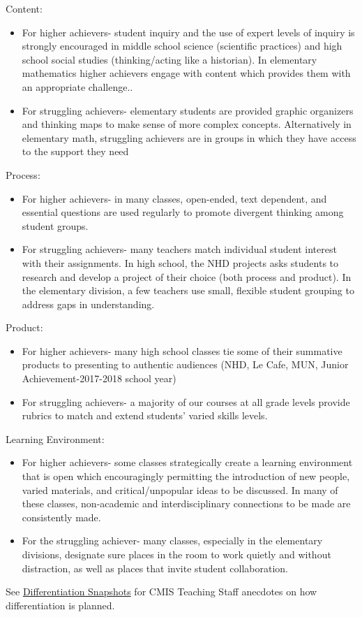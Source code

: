\documentclass{report}
\begin{document}
\begin{findings}
Content:
\begin{itemize}
\item For higher achievers- student inquiry and the use of expert levels of inquiry is strongly encouraged in middle school science (scientific practices) and high school social studies (thinking/acting like a historian). In elementary mathematics higher achievers engage with content which provides them with an appropriate challenge..
\item For struggling achievers- elementary students are provided graphic organizers and thinking maps to make sense of more complex concepts. Alternatively in elementary math, struggling achievers are in groups in which they have access to the support they need
\end{itemize}
Process:
\begin{itemize} 
\item For higher achievers- in many classes, open-ended, text dependent, and essential questions are used regularly to promote divergent thinking among student groups. 
\item For struggling achievers- many teachers match individual student interest with their assignments. In high school, the NHD projects asks students to research and develop a project of their choice (both process and product). In the elementary division, a few teachers use small, flexible student grouping to address gaps in understanding. 
\end{itemize}
Product:
\begin{itemize}
\item For higher achievers- many high school classes tie some of their summative products to presenting to authentic audiences (NHD, Le Cafe, MUN, Junior Achievement-2017-2018 school year) 
\item For struggling achievers- a majority of our courses at all grade levels provide rubrics to match and extend students' varied skills levels.
\end{itemize}
Learning Environment:
\begin{itemize}
\item For higher achievers- some classes strategically create a learning environment that is open which encouragingly permitting the introduction of new people, varied materials, and critical/unpopular ideas to be discussed. In many of these classes, non-academic and interdisciplinary connections to be made are consistently made. 
\item For the struggling achiever- many classes, especially in the elementary divisions, designate sure places in the room to work quietly and without distraction, as well as places that invite student collaboration.
\end{itemize}
See \href{https://docs.google.com/a/cmis.ac.th/document/d/1-1JJSv17D_c977S9eurKz7ciZOyoZOscboWPTEE3hAs/edit?usp=sharing}{Differentiation Snapshots} for CMIS Teaching Staff anecdotes on how differentiation is planned. 


\end{findings}
\end{document}
